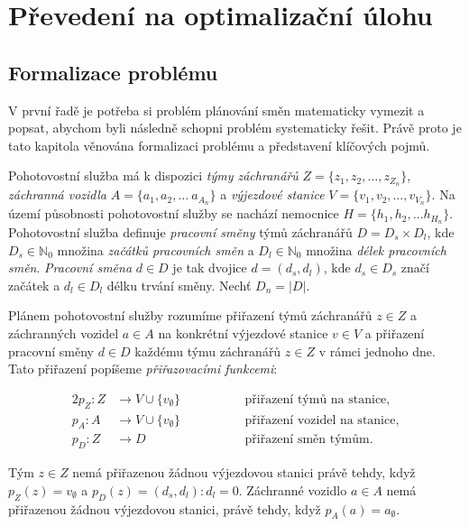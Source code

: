 \chapter{Převedení na optimalizační úlohu}

\section{Formalizace problému}\label{kap:formalizaceProblemu}

V první řadě je potřeba si problém plánování směn matematicky vymezit a popsat, abychom byli následně schopni problém systematicky řešit. 
Právě proto je tato kapitola věnována formalizaci problému a představení klíčových pojmů. 

Pohotovostní služba má k dispozici \textit{týmy záchranářů} $Z = \{ z_1, z_2, \dots, z_{Z_n} \}$, \textit{záchranná vozidla} $A = \{ a_1, a_2, \dots\ a_{A_n} \}$
a \textit{výjezdové stanice} $V = \{ v_1, v_2, \dots, v_{V_n} \}$. 
Na území působnosti pohotovostní služby se nachází nemocnice $H = \{ h_1, h_2, \dots h_{H_n} \}$.
Pohotovostní služba definuje \textit{pracovní směny} týmů záchranářů $D = D_{s} \times D_{l}$, 
kde $D_{s} \in \mathbb{N}_0$ množina \textit{začátků pracovních směn} a $D_{l} \in \mathbb{N}_0$ množina \textit{délek pracovních směn}.
\textit{Pracovní směna} $d \in D$ je tak dvojice $d = (d_s, d_l)$, kde $d_{s} \in D_{s}$ značí začátek a $d_{l} \in D_{l}$ délku trvání směny.
Nechť $D_n = |D|$.

Plánem pohotovostní služby rozumíme přiřazení týmů záchranářů $z \in Z$ a záchranných vozidel $a \in A$ na konkrétní výjezdové stanice $v \in V$
a přiřazení pracovní směny $d \in D$ každému týmu záchranářů $z \in Z$ v rámci jednoho dne.
Tato přiřazení popíšeme \textit{přiřazovacími funkcemi}:
\begin{definice}
  \begin{alignat*}{2}
    p_Z \colon Z &\rightarrow V \cup \{ v_{\emptyset} \} \quad && \hspace{30pt} \text{přiřazení týmů na stanice}, \\
    p_A \colon A &\rightarrow V \cup \{ v_{\emptyset} \} \quad && \hspace{30pt} \text{přiřazení vozidel na stanice}, \\ 
    p_{D} \colon Z &\rightarrow D                        \quad && \hspace{30pt} \text{přiřazení směn týmům}.
  \end{alignat*}
\end{definice}
Tým $z \in Z$ nemá přiřazenou žádnou výjezdovou stanici právě tehdy, když
$p_{Z}(z) = v_{\emptyset}$ a $p_{D}(z) = (d_s, d_l) \colon d_l = 0$.
Záchranné vozidlo $a \in A$ nemá přiřazenou žádnou výjezdovou stanici, právě tehdy, když $p_{A}(a) = a_{\emptyset}$.

